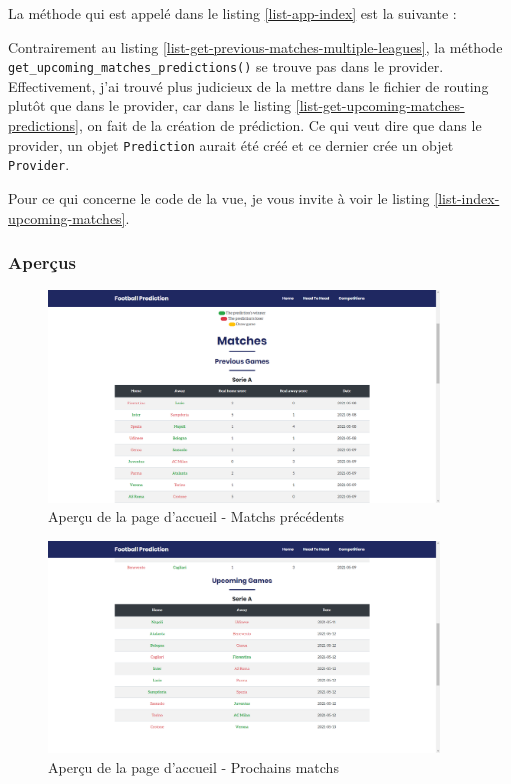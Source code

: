 \documentclass[a4paper,14pt]{extarticle}
\begin{document}
{La méthode qui est appelé dans le listing \ref{list-app-index} est la suivante :


Contrairement au listing \ref{list-get-previous-matches-multiple-leagues}, la méthode \texttt{get\_upcoming\_matches\_predictions()} se trouve pas dans le provider. Effectivement, j'ai trouvé plus judicieux de la mettre dans le fichier de routing plutôt que dans le provider, car dans le listing \ref{list-get-upcoming-matches-predictions}, on fait de la création de prédiction. Ce qui veut dire que dans le provider, un objet \texttt{Prediction} aurait été créé et ce dernier crée un objet \texttt{Provider}. 
 
Pour ce qui concerne le code de la vue, je vous invite à voir le listing \ref{list-index-upcoming-matches}.


\subsubsection{Aperçus}

\begin{figure}[htp]
    \centering
    \includegraphics[width=28em]{../img/previousGamesAccueil.png}
    \caption{Aperçu de la page d'accueil - Matchs précédents}
    \label{fig:previousGamesAccueil}
\end{figure}

\begin{figure}[htp]
    \centering
    \includegraphics[width=28em]{../img/upcomingGamesAccueil.png}
    \caption{Aperçu de la page d'accueil - Prochains matchs}
    \label{fig:upcomingGamesAccueil}
\end{figure}

}
\end{document}
